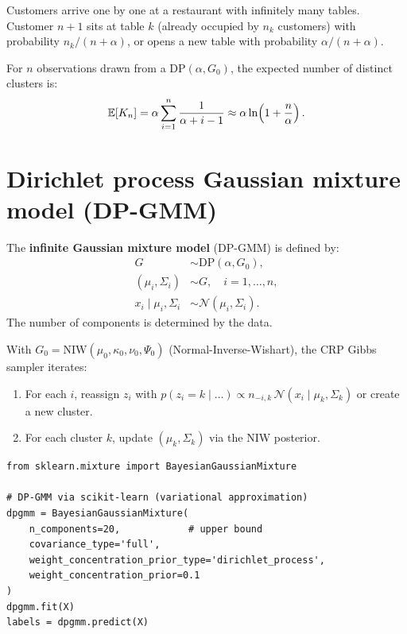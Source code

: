\begin{intuition}[title=\textbf{Restaurant metaphor}]
Customers arrive one by one at a restaurant with infinitely many tables.
Customer $n+1$ sits at table $k$ (already occupied by $n_k$ customers) with
probability $n_k / (n + \alpha)$, or opens a new table with probability
$\alpha / (n + \alpha)$.
\end{intuition}

\begin{proposition}
For $n$ observations drawn from a $\mathrm{DP}(\alpha, G_0)$, the expected
number of distinct clusters is:
\[
  \mathbb{E}[K_n] = \alpha \sum_{i=1}^{n} \frac{1}{\alpha + i - 1}
           \approx \alpha \ln\!\left(1 + \frac{n}{\alpha}\right).
\]
\end{proposition}

\section{Dirichlet process Gaussian mixture model (DP-GMM)}

\begin{definition}[DP-GMM]
The \textbf{infinite Gaussian mixture model} (DP-GMM) is defined by:
\begin{align}
  G &\sim \mathrm{DP}(\alpha, G_0), \\
  (\mu_i, \Sigma_i) &\sim G, \quad i = 1, \ldots, n, \\
  x_i \mid \mu_i, \Sigma_i &\sim \mathcal{N}(\mu_i, \Sigma_i).
\end{align}
The number of components is determined by the data.
\end{definition}

\begin{example}
With $G_0 = \mathrm{NIW}(\mu_0, \kappa_0, \nu_0, \Psi_0)$ (Normal-Inverse-Wishart),
the CRP Gibbs sampler iterates:
\begin{enumerate}
  \item For each $i$, reassign $z_i$ with $p(z_i = k \mid \ldots) \propto
        n_{-i,k}\,\mathcal{N}(x_i \mid \mu_k, \Sigma_k)$ or create a new cluster.
  \item For each cluster $k$, update $(\mu_k, \Sigma_k)$ via the NIW posterior.
\end{enumerate}
\end{example}

\begin{verbatim}
from sklearn.mixture import BayesianGaussianMixture

# DP-GMM via scikit-learn (variational approximation)
dpgmm = BayesianGaussianMixture(
    n_components=20,            # upper bound
    covariance_type='full',
    weight_concentration_prior_type='dirichlet_process',
    weight_concentration_prior=0.1
)
dpgmm.fit(X)
labels = dpgmm.predict(X)
\end{verbatim}

